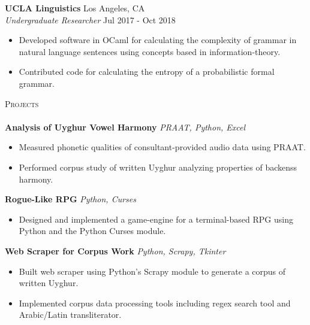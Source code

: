 \documentclass[]{article}
\newcommand{\lineunder} {
    \vspace*{-8pt} \\
    \hspace*{-18pt} \hrulefill \\
}
\newcommand{\header} [1] {
    {\hspace*{-18pt}\vspace*{6pt} \textsc{#1}}
    \vspace*{-6pt} \lineunder
}
\begin{document}
\textbf{UCLA Linguistics} \hfill Los Angeles, CA\\
\textit{Undergraduate Researcher} \hfill Jul 2017 - Oct 2018\\
\vspace{-3mm}
\begin{itemize} \itemsep 0pt
	\item Developed software in OCaml for calculating the complexity of grammar in natural language sentences using concepts based in information-theory.
	\item Contributed code for calculating the entropy of a probabilistic formal grammar.
\end{itemize}

\header{Projects}
{\textbf{Analysis of Uyghur Vowel Harmony}} \hspace*{5mm} {\sl PRAAT, Python, Excel}
\vspace*{-5pt}\begin{itemize}	\itemsep 0pt 
	\item Measured phonetic qualities of consultant-provided audio data using PRAAT.
	\item Performed corpus study of written Uyghur analyzing properties of backenss harmony.
\end{itemize}
\vspace*{0mm}

{\textbf{Rogue-Like RPG}} \hspace*{5mm} {\sl Python, Curses} \\
\vspace*{-5pt}\begin{itemize}	\itemsep 0pt
	\item Designed and implemented a game-engine for a terminal-based RPG using Python and the Python Curses module.
\end{itemize}
\vspace*{0mm}

{\textbf{Web Scraper for Corpus Work}} \hspace*{5mm} {\sl Python, Scrapy, Tkinter}
\vspace*{-5pt}\begin{itemize}	\itemsep 0pt 
	\item Built web scraper using Python's Scrapy module to generate a corpus of written Uyghur.
	\item Implemented corpus data processing tools including regex search tool and Arabic/Latin transliterator.
\end{itemize}
\vspace*{0mm}
\end{document}
